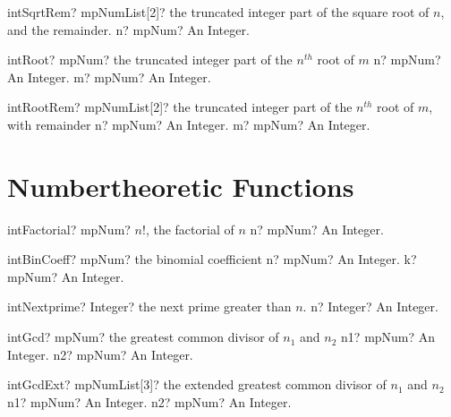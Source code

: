 \documentclass[12pt,a4paper,openany]{book}
\begin{document}
\begin{mpFunctionsExtract}
\mpFunctionOne
{intSqrtRem? mpNumList[2]? the truncated integer part of the square root of $n$, and the remainder.}
{n? mpNum? An Integer.}
\end{mpFunctionsExtract}

\begin{mpFunctionsExtract}
\mpFunctionTwo
{intRoot? mpNum? the truncated integer part of the $n^{th}$ root of $m$}
{n? mpNum? An Integer.}
{m? mpNum? An Integer.}
\end{mpFunctionsExtract}

\begin{mpFunctionsExtract}
\mpFunctionTwo
{intRootRem? mpNumList[2]? the truncated integer part of the $n^{th}$ root of $m$, with remainder}
{n? mpNum? An Integer.}
{m? mpNum? An Integer.}
\end{mpFunctionsExtract}

\section{Numbertheoretic Functions}

\begin{mpFunctionsExtract}
\mpFunctionOne
{intFactorial? mpNum?  $n!$, the factorial of $n$}
{n? mpNum? An Integer.}
\end{mpFunctionsExtract}

\begin{mpFunctionsExtract}
\mpFunctionTwo
{intBinCoeff? mpNum? the binomial coefficient}
{n? mpNum? An Integer.}
{k? mpNum? An Integer.}
\end{mpFunctionsExtract}

\begin{mpFunctionsExtract}
\mpFunctionOne
{intNextprime? Integer?  the next prime greater than $n$.}
{n? Integer? An Integer.}
\end{mpFunctionsExtract}

\begin{mpFunctionsExtract}
\mpFunctionTwo
{intGcd? mpNum? the greatest common divisor of $n_1$ and $n_2$}
{n1? mpNum? An Integer.}
{n2? mpNum? An Integer.}
\end{mpFunctionsExtract}

\begin{mpFunctionsExtract}
\mpFunctionTwo
{intGcdExt? mpNumList[3]? the extended greatest common divisor of $n_1$ and $n_2$}
{n1? mpNum? An Integer.}
{n2? mpNum? An Integer.}
\end{mpFunctionsExtract}
\end{document}
